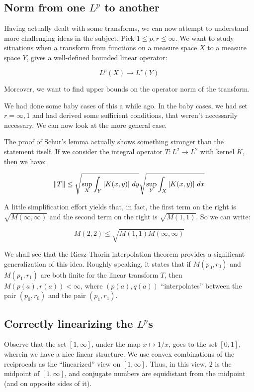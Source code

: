 \documentclass[a4paper]{amsart}
\newcommand{\norm}[1]{\left\|#1\right\|}
\begin{document}
\subsection{Norm from one $L^p$ to another}

Having actually dealt with some transforms, we can now attempt to
understand more challenging ideas in the subject. Pick $1 \le p,r \le
\infty$. We want to study situations when a transform from functions
on a measure space $X$ to a measure space $Y$, gives a well-defined
bounded linear operator:

$$L^p(X) \to L^r(Y)$$

Moreover, we want to find upper bounds on the operator norm of the
transform.

We had done some baby cases of this a while ago. In the baby cases, we
had set $r = \infty, 1$ and had derived some sufficient conditions,
that weren't necessarily necessary. We can now look at the more general case.

The proof of Schur's lemma actually shows something stronger than the
statement itself.  If we consider the integral operator $T: L^2 \to L^2$ with kernel
$K$, then we have:

$$\norm{T} \le \sqrt{\sup_X \int_Y \abs{K(x,y)} \, dy} \sqrt{\sup_Y \int_X \abs{K(x,y)} \, dx}$$

A little simplification effort yields that, in fact, the first term on
the right is $\sqrt{M(\infty,\infty)}$ and the second term on the
right is $\sqrt{M(1,1)}$. So we can write:

$$M(2,2) \le \sqrt{M(1,1)M(\infty,\infty)}$$

We shall see that the Riesz-Thorin interpolation theorem provides a
significant generalization of this idea. Roughly speaking, it states
that if $M(p_0,r_0)$ and $M(p_1,r_1)$ are both finite for the linear
transform $T$, then $M(p(a),r(a)) < \infty$, where $(p(a),q(a))$
``interpolates'' between the pair $(p_0,r_0)$ and the pair
$(p_1,r_1)$.

\subsection{Correctly linearizing the $L^p$s}

Observe that the set $[1,\infty]$, under the map $x \mapsto 1/x$, goes
to the set $[0,1]$, wherein we have a nice linear structure. We use
convex combinations of the reciprocals as the ``linearized'' view on
$[1,\infty]$. Thus, in this view, $2$ is the midpoint of $[1,\infty]$,
and conjugate numbers are equidistant from the midpoint (and on
opposite sides of it).
\end{document}
